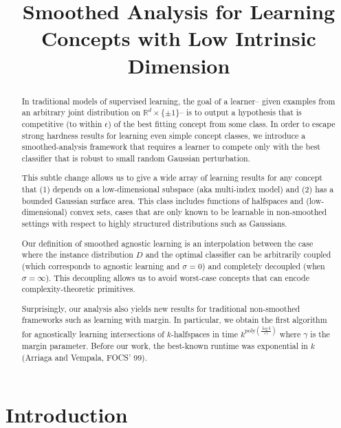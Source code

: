 \documentclass{theoretics}
\title{Smoothed Analysis for Learning Concepts with Low Intrinsic Dimension}
\newcommand{\poly}{\mathrm{poly}}
\newcommand{\1}{\Ind}
\begin{document}
\maketitle

\begin{abstract}%

In traditional models of supervised learning, the goal of a learner-- given examples from an arbitrary joint distribution on $\mathbb{R}^d \times \{\pm 1\}$-- is to output a hypothesis that is competitive (to within $\epsilon$) of the best fitting concept from some class.  In order to escape strong hardness results for learning even simple concept classes, we introduce a smoothed-analysis framework that requires a learner to compete only with the best classifier that is robust to small random Gaussian perturbation.

This subtle change allows us to give a wide array of learning results for any concept that (1) depends on a low-dimensional subspace (aka multi-index model) and (2) has a bounded Gaussian surface area.  This class includes functions of halfspaces and (low-dimensional) convex sets, cases that are only known to be learnable in non-smoothed settings with respect to highly structured distributions such as Gaussians.

Our definition of smoothed agnostic learning is an interpolation between the case where the instance distribution $D$ and the optimal classifier can be arbitrarily coupled (which corresponds to agnostic learning and $\sigma = 0$) and completely decoupled (when $\sigma = \infty$).  This decoupling allows us to avoid worst-case concepts that can encode complexity-theoretic primitives.

Surprisingly, our analysis also yields new results for traditional non-smoothed frameworks such as learning with margin.  In particular, we obtain the first algorithm for agnostically learning intersections of $k$-halfspaces in time  $k^{\poly(\frac{\log k}{\epsilon \gamma}) }$ where $\gamma$ is the margin parameter.  
Before our work, the best-known runtime was exponential in $k$ (Arriaga and Vempala, FOCS' 99).




\end{abstract}


\section{Introduction}
\end{document}
